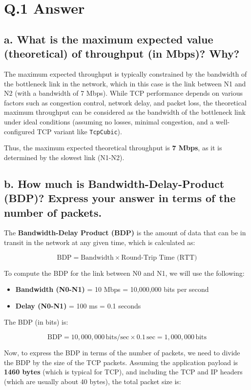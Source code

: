 \documentclass{article}
\begin{document}
\section*{Q.1 Answer}

\subsection*{a. What is the maximum expected value (theoretical) of throughput (in Mbps)? Why?}

The maximum expected throughput is typically constrained by the bandwidth of the bottleneck link in the network, which in this case is the link between N1 and N2 (with a bandwidth of 7 Mbps). While TCP performance depends on various factors such as congestion control, network delay, and packet loss, the theoretical maximum throughput can be considered as the bandwidth of the bottleneck link under ideal conditions (assuming no losses, minimal congestion, and a well-configured TCP variant like \texttt{TcpCubic}).

Thus, the maximum expected theoretical throughput is \textbf{7 Mbps}, as it is determined by the slowest link (N1-N2).

\subsection*{b. How much is Bandwidth-Delay-Product (BDP)? Express your answer in terms of the number of packets.}

The \textbf{Bandwidth-Delay Product (BDP)} is the amount of data that can be in transit in the network at any given time, which is calculated as:

\[
\text{BDP} = \text{Bandwidth} \times \text{Round-Trip Time (RTT)}
\]

To compute the BDP for the link between N0 and N1, we will use the following:

\begin{itemize}
    \item \textbf{Bandwidth (N0-N1)} = 10 Mbps = 10,000,000 bits per second
    \item \textbf{Delay (N0-N1)} = 100 ms = 0.1 seconds
\end{itemize}

The BDP (in bits) is:

\[
\text{BDP} = 10,000,000 \, \text{bits/sec} \times 0.1 \, \text{sec} = 1,000,000 \, \text{bits}
\]

Now, to express the BDP in terms of the number of packets, we need to divide the BDP by the size of the TCP packets. Assuming the application payload is \textbf{1460 bytes} (which is typical for TCP), and including the TCP and IP headers (which are usually about 40 bytes), the total packet size is:
\end{document}
